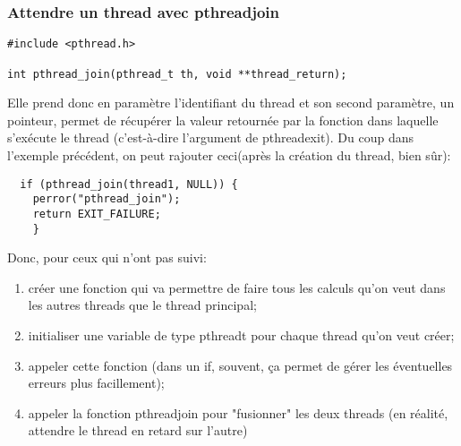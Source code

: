 \documentclass[a4paper]{article}
\begin{document}
\subsubsection{Attendre un thread avec pthread\textunderscore{}join}
\begin{lstlisting}
#include <pthread.h>

int pthread_join(pthread_t th, void **thread_return);
\end{lstlisting}
Elle prend donc en paramètre l'identifiant du thread et son second paramètre, un pointeur, permet de récupérer la valeur retournée par la fonction dans laquelle s'exécute le thread (c'est-à-dire l'argument de pthread\textunderscore{}exit).\newline
Du coup dans l'exemple précédent, on peut rajouter ceci(après la création du thread, bien sûr):
\begin{lstlisting}
  if (pthread_join(thread1, NULL)) {
    perror("pthread_join");
    return EXIT_FAILURE;
    }
\end{lstlisting}
Donc, pour ceux qui n'ont pas suivi:
\begin{enumerate}
  \item créer une fonction qui va permettre de faire tous les calculs qu'on veut dans les autres threads que le thread principal;
  \item initialiser une variable de type pthread\textunderscore{}t pour chaque thread qu'on veut créer;
  \item appeler cette fonction (dans un if, souvent, ça permet de gérer les éventuelles erreurs plus facillement);
  \item appeler la fonction pthread\textunderscore{}join pour "fusionner" les deux threads (en réalité, attendre le thread en retard sur l'autre)
\end{enumerate}
\end{document}
